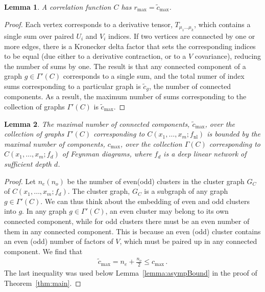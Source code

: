 \documentclass[english]{article}
\newtheorem{lemma}{Lemma}
\newcommand{\Gset}{\Gamma'(C)}
\newcommand{\fnl}{f_{\mathrm{nl}}}
\newcommand{\es}[2] {\begin{align} \label{#1} #2 \end{align}}
\begin{document}
\begin{lemma} \label{lemma:number_of_sums}
A correlation function $C$ has $r_{\textrm{max}} = \tilde{c}_{\textrm{max}}$. 
\end{lemma}
\begin{proof}
Each vertex corresponds to a derivative tensor, $T_{\mu_{1}\ldots\mu_{k}}$, which contains a single sum over paired $U_{i}$ and $V_{i}$ indices.
If two vertices are connected by one or more edges, there is a Kronecker delta factor that sets the corresponding indices to be equal (due either to a derivative contraction, or to a $V$ covariance), reducing the number of sums by one.
The result is that any connected component of a graph $g \in \Gset$ corresponds to a single sum, and the total numer of index sums corresponding to a particular graph is $\tilde{c}_{g}$, the number of connected components. As a result, the maximum number of sums corresponding to the collection of graphs $\Gset$ is $\tilde{c}_{\textrm{max}}$.
\end{proof}
\begin{lemma} \label{lemma:1hlconcomps}
The maximal number of connected components, $\tilde{c}_{\textrm{max}}$, over the collection of graphs $\Gset$ corresponding to $C(x_1,\dots,x_m;\fnl)$ is bounded by the maximal number of components, $c_{\textrm{max}}$, over the collection $\Gamma(C)$ corresponding to $C(x_1,\dots,x_m;f_{d})$ of Feynman diagrams, where $f_{d}$ is a deep linear network of sufficient depth $d$.
\end{lemma}
\begin{proof}
  Let $n_e(n_o)$ be the number of even(odd) clusters in the cluster graph $G_C$ of $C(x_1,\dots,x_m;f_d)$. The cluster graph, $G_C$ is a subgraph of any graph $g\in \Gset$. We can thus think about the embedding of even and odd clusters into $g$.
  In any graph $g \in \Gset$, an even cluster may belong to its own connected component, while for odd clusters there must be an even number of them in any connected component.
  This is because an even (odd) cluster contains an even (odd) number of factors of $V$, which must be paired up in any connected component.
  We find that
\es{tildecmax_bound}{
\tilde{c}_{\textrm{max}} = n_e+\frac{n_o}{2}\leq c_{\textrm{max}}\,.
}
The last inequality was used below Lemma~\ref{lemma:asympBound} in the proof of Theorem~\ref{thm:main}.
\end{proof}
\end{document}
